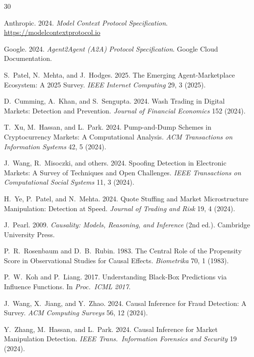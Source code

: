 \documentclass[sigconf,nonacm]{acmart}
\begin{document}
\sloppy

\begin{thebibliography}{30}

Anthropic. 2024. \textit{Model Context Protocol Specification}.
\url{https://modelcontextprotocol.io}

Google. 2024. \textit{Agent2Agent (A2A) Protocol Specification}.
Google Cloud Documentation.

S.~Patel, N.~Mehta, and J.~Hodges. 2025. The Emerging
Agent-Marketplace Ecosystem: A 2025 Survey.
\textit{IEEE Internet Computing} 29, 3 (2025).

D.~Cumming, A.~Khan, and S.~Sengupta. 2024. Wash Trading in
Digital Markets: Detection and Prevention.
\textit{Journal of Financial Economics} 152 (2024).

T.~Xu, M.~Hassan, and L.~Park. 2024. Pump-and-Dump Schemes in
Cryptocurrency Markets: A Computational Analysis.
\textit{ACM Transactions on Information Systems} 42, 5 (2024).

J.~Wang, R.~Misoczki, and others. 2024. Spoofing Detection in
Electronic Markets: A Survey of Techniques and Open Challenges.
\textit{IEEE Transactions on Computational Social Systems} 11, 3
(2024).

H.~Ye, P.~Patel, and N.~Mehta. 2024. Quote Stuffing and Market
Microstructure Manipulation: Detection at Speed.
\textit{Journal of Trading and Risk} 19, 4 (2024).

J.~Pearl. 2009. \textit{Causality: Models, Reasoning, and Inference}
(2nd ed.). Cambridge University Press.

P.~R.~Rosenbaum and D.~B.~Rubin. 1983. The Central Role of the
Propensity Score in Observational Studies for Causal Effects.
\textit{Biometrika} 70, 1 (1983).

P.~W.~Koh and P.~Liang. 2017. Understanding Black-Box Predictions
via Influence Functions. In \textit{Proc.\ ICML 2017}.

J.~Wang, X.~Jiang, and Y.~Zhao. 2024. Causal Inference for Fraud
Detection: A Survey. \textit{ACM Computing Surveys} 56, 12 (2024).

Y.~Zhang, M.~Hassan, and L.~Park. 2024. Causal Inference for
Market Manipulation Detection. \textit{IEEE Trans.\ Information
Forensics and Security} 19 (2024).


\end{thebibliography}
\end{document}

